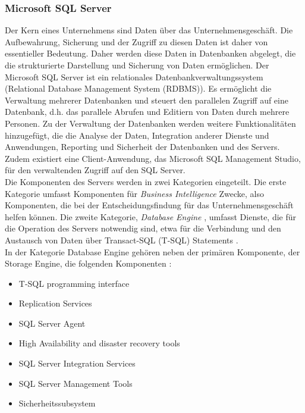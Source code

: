 \subsubsection{Microsoft SQL Server}
Der Kern eines Unternehmens sind Daten über das Unternehmensgeschäft. Die Aufbewahrung, Sicherung und der Zugriff zu diesen Daten ist daher von essentieller Bedeutung. Daher werden diese Daten in Datenbanken abgelegt, die die strukturierte Darstellung und Sicherung von Daten ermöglichen. Der Microsoft SQL Server ist ein relationales Datenbankverwaltungssystem (Relational Database Management System (RDBMS)). Es ermöglicht die Verwaltung mehrerer Datenbanken und steuert den parallelen Zugriff auf eine Datenbank, d.h. das parallele Abrufen und Editiern von Daten durch mehrere Personen. Zu der Verwaltung der Datenbanken werden weitere Funktionalitäten hinzugefügt, die die Analyse der Daten, Integration anderer Dienste und Anwendungen, Reporting und Sicherheit der Datenbanken und des Servers. Zudem existiert eine Client-Anwendung, das Microsoft SQL Management Studio, für den verwaltenden Zugriff auf den SQL Server. \\

Die Komponenten des Servers werden in zwei Kategorien eingeteilt. Die erste Kategorie umfasst Komponenten für \textit{Business Intelligence}  Zwecke, also Komponenten, die bei der Entscheidungsfindung für das Unternehmensgeschäft helfen können. Die zweite Kategorie, \textit{Database Engine} , umfasst Dienste, die für die Operation des Servers notwendig sind, etwa für die Verbindung und den Austausch von Daten über Transact-SQL (T-SQL) Statements \citep{MSSQL2}. \\

In der Kategorie Database Engine gehören neben der primären Komponente, der Storage Engine, die folgenden Komponenten \citep{MSSQL3}:
\begin{itemize}
\item T-SQL programming interface
\item Replication Services
\item SQL Server Agent
\item High Availability and disaster recovery tools
\item SQL Server Integration Services
\item SQL Server Management Tools
\item Sicherheitssubsystem
\end{itemize}



